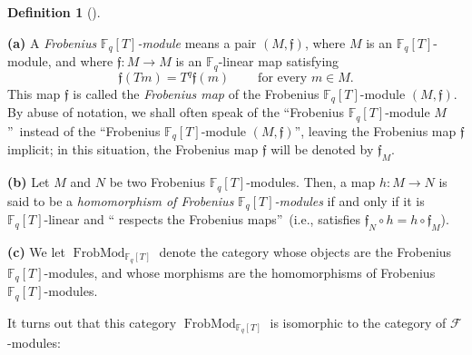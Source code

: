 \documentclass[numbers=enddot,12pt,final,onecolumn,notitlepage]{scrartcl}%
\theoremstyle{definition}
\newtheorem{defi}[theo]{Definition}
\newenvironment{definition}[1][]
{\begin{defi}[#1]\begin{leftbar}}
{\end{leftbar}\end{defi}}
\begin{document}
\begin{definition}
\label{def.F.frobmod}\textbf{(a)} A \textit{Frobenius }$\mathbb{F}_{q}\left[
T\right]  $\textit{-module} means a pair $\left(  M,\mathfrak{f}\right)  $,
where $M$ is an $\mathbb{F}_{q}\left[  T\right]  $-module, and where
$\mathfrak{f}:M\rightarrow M$ is an $\mathbb{F}_{q}$-linear map satisfying%
\begin{equation}
\mathfrak{f}\left(  Tm\right)  =T^{q}\mathfrak{f}\left(  m\right)
\ \ \ \ \ \ \ \ \ \ \text{for every }m\in M. \label{eq.def.F.frobmod.axiom}%
\end{equation}
This map $\mathfrak{f}$ is called the \textit{Frobenius map} of the Frobenius
$\mathbb{F}_{q}\left[  T\right]  $-module $\left(  M,\mathfrak{f}\right)  $.
By abuse of notation, we shall often speak of the \textquotedblleft Frobenius
$\mathbb{F}_{q}\left[  T\right]  $-module $M$\textquotedblright\ instead of
the \textquotedblleft Frobenius $\mathbb{F}_{q}\left[  T\right]  $-module
$\left(  M,\mathfrak{f}\right)  $\textquotedblright, leaving the Frobenius map
$\mathfrak{f}$ implicit; in this situation, the Frobenius map $\mathfrak{f}$
will be denoted by $\mathfrak{f}_{M}$.

\textbf{(b)} Let $M$ and $N$ be two Frobenius $\mathbb{F}_{q}\left[  T\right]
$-modules. Then, a map $h:M\rightarrow N$ is said to be a \textit{homomorphism
of Frobenius }$\mathbb{F}_{q}\left[  T\right]  $\textit{-modules} if and only
if it is $\mathbb{F}_{q}\left[  T\right]  $-linear and \textquotedblleft
respects the Frobenius maps\textquotedblright\ (i.e., satisfies $\mathfrak{f}%
_{N}\circ h=h\circ\mathfrak{f}_{M}$).

\textbf{(c)} We let $\operatorname*{FrobMod}\nolimits_{\mathbb{F}_{q}\left[
T\right]  }$ denote the category whose objects are the Frobenius
$\mathbb{F}_{q}\left[  T\right]  $-modules, and whose morphisms are the
homomorphisms of Frobenius $\mathbb{F}_{q}\left[  T\right]  $-modules.
\end{definition}

It turns out that this category $\operatorname*{FrobMod}\nolimits_{\mathbb{F}%
_{q}\left[  T\right]  }$ is isomorphic to the category of $\mathcal{F}$-modules:
\end{document}
